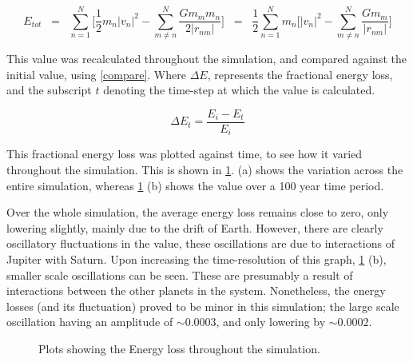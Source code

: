 \documentclass[a4paper,10pt]{article}
\begin{document}
\begin{equation} \label{E_tot}
    E_{tot}  \;\; =  \;\;  \sum\limits_{n=1}^{N} \bigg[ \frac{1}{2}m_n\left|v_n\right|^2 - \sum\limits_{m\neq n}^{N}\frac{G m_m m_n}{2 \left|r_{nm}\right|}\bigg]  \;\; = \;\; \frac{1}{2} \sum\limits_{n=1}^{N}m_n \bigg[\left|v_n\right|^2 - \sum\limits_{m\neq n}^{N}\frac{G m_m}{\left|r_{nm}\right|}\bigg] 
 \end{equation}
 
 This value was recalculated throughout the simulation, and compared against the initial value, using \cref{compare}. Where $ \Delta E$, represents the fractional energy loss, and the subscript $t$ denoting the time-step at which the value is calculated.
 
 \begin{equation} \label{compare}
    \Delta E_t =  \frac{E_i - E_t}{E_i}
\end{equation}

This fractional energy loss was plotted against time, to see how it varied throughout the simulation. This is shown in \cref{Energy}.  (a) shows the variation across the entire simulation, whereas \cref{Energy} (b) shows the value over a 100 year time period. 

Over the whole simulation, the average energy loss remains close to zero, only lowering slightly, mainly due to the drift of Earth. However, there are clearly oscillatory fluctuations in the value, these oscillations are due to interactions of Jupiter with Saturn. Upon increasing the time-resolution of this graph, \cref{Energy} (b), smaller scale oscillations can be seen. These are presumably a result of interactions between the other planets in the system. Nonetheless, the energy losses (and its fluctuation) proved to be minor in this simulation; the large scale oscillation having an amplitude of $\sim 0.0003$, and only lowering by $\sim 0.0002$.

\begin{figure}[h!]
    \centering
    \qquad
    \caption{Plots showing the Energy loss throughout the simulation.}%
    \label{Energy}%
\end{figure}
\end{document}
